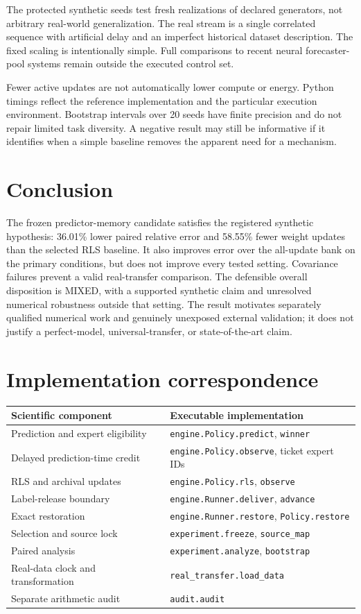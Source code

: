 \documentclass[10pt]{article}
\begin{document}
The protected synthetic seeds test fresh realizations of declared generators, not arbitrary real-world generalization. The real stream is a single correlated sequence with artificial delay and an imperfect historical dataset description. The fixed scaling is intentionally simple. Full comparisons to recent neural forecaster-pool systems remain outside the executed control set.

Fewer active updates are not automatically lower compute or energy. Python timings reflect the reference implementation and the particular execution environment. Bootstrap intervals over 20 seeds have finite precision and do not repair limited task diversity. A negative result may still be informative if it identifies when a simple baseline removes the apparent need for a mechanism.

\section{Conclusion}
The frozen predictor-memory candidate satisfies the registered synthetic hypothesis: 36.01\% lower paired relative error and 58.55\% fewer weight updates than the selected RLS baseline. It also improves error over the all-update bank on the primary conditions, but does not improve every tested setting. Covariance failures prevent a valid real-transfer comparison. The defensible overall disposition is MIXED, with a supported synthetic claim and unresolved numerical robustness outside that setting. The result motivates separately qualified numerical work and genuinely unexposed external validation; it does not justify a perfect-model, universal-transfer, or state-of-the-art claim.

\appendix
\section{Implementation correspondence}
\begin{tabular}{p{.30\linewidth}p{.63\linewidth}}
\toprule
Scientific component & Executable implementation\\
\midrule
Prediction and expert eligibility & \texttt{engine.Policy.predict}, \texttt{winner}\\
Delayed prediction-time credit & \texttt{engine.Policy.observe}, ticket expert IDs\\
RLS and archival updates & \texttt{engine.Policy.rls}, \texttt{observe}\\
Label-release boundary & \texttt{engine.Runner.deliver}, \texttt{advance}\\
Exact restoration & \texttt{engine.Runner.restore}, \texttt{Policy.restore}\\
Selection and source lock & \texttt{experiment.freeze}, \texttt{source\_map}\\
Paired analysis & \texttt{experiment.analyze}, \texttt{bootstrap}\\
Real-data clock and transformation & \texttt{real\_transfer.load\_data}\\
Separate arithmetic audit & \texttt{audit.audit}\\
\bottomrule
\end{tabular}
\end{document}
